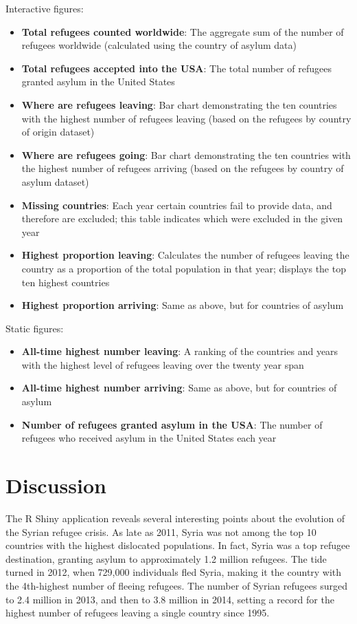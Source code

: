 \documentclass{article}
\begin{document}
\noindent Interactive figures:
\begin{itemize}
\item \textbf{Total refugees counted worldwide}: The aggregate sum of the number of refugees worldwide (calculated using the country of asylum data)
\item \textbf{Total refugees accepted into the USA}: The total number of refugees granted asylum in the United States
\item \textbf{Where are refugees leaving}: Bar chart demonstrating the ten countries with the highest number of refugees leaving (based on the refugees by country of origin dataset)
\item \textbf{Where are refugees going}: Bar chart demonstrating the ten countries with the highest number of refugees arriving (based on the refugees by country of asylum dataset)
\item \textbf{Missing countries}: Each year certain countries fail to provide data, and therefore are excluded; this table indicates which were excluded in the given year
\item \textbf{Highest proportion leaving}: Calculates the number of refugees leaving the country as a proportion of the total population in that year; displays the top ten highest countries
\item \textbf{Highest proportion arriving}: Same as above, but for countries of asylum
\end{itemize}
\noindent Static figures:
\begin{itemize}
\item \textbf{All-time highest number leaving}: A ranking of the countries and years with the highest level of refugees leaving over the twenty year span
\item \textbf{All-time highest number arriving}: Same as above, but for countries of asylum
\item \textbf{Number of refugees granted asylum in the USA}: The number of refugees who received asylum in the United States each year
\end{itemize}

\section{Discussion}

\noindent The R Shiny application reveals several interesting points about the evolution of the Syrian refugee crisis. As late as 2011, Syria was not among the top 10 countries with the highest dislocated populations. In fact, Syria was a top refugee destination, granting asylum to approximately 1.2 million refugees. The tide turned in 2012, when 729,000 individuals fled Syria, making it the country with the 4th-highest number of fleeing refugees. The number of Syrian refugees surged to 2.4 million in 2013, and then to 3.8 million in 2014, setting a record for the highest number of refugees leaving a single country since 1995.\vspace{2mm}
\end{document}
